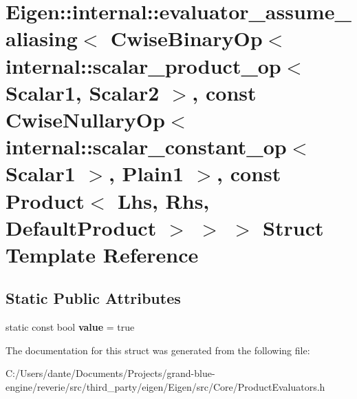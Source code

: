 \hypertarget{struct_eigen_1_1internal_1_1evaluator__assume__aliasing_3_01_cwise_binary_op_3_01internal_1_1scae866e2c7242096d7b5fd789e3b867e0a}{}\section{Eigen\+::internal\+::evaluator\+\_\+assume\+\_\+aliasing$<$ Cwise\+Binary\+Op$<$ internal\+::scalar\+\_\+product\+\_\+op$<$ Scalar1, Scalar2 $>$, const Cwise\+Nullary\+Op$<$ internal\+::scalar\+\_\+constant\+\_\+op$<$ Scalar1 $>$, Plain1 $>$, const Product$<$ Lhs, Rhs, Default\+Product $>$ $>$ $>$ Struct Template Reference}
\label{struct_eigen_1_1internal_1_1evaluator__assume__aliasing_3_01_cwise_binary_op_3_01internal_1_1scae866e2c7242096d7b5fd789e3b867e0a}
\subsection*{Static Public Attributes}
\begin{DoxyCompactItemize}
\item 
\mbox{\label{struct_eigen_1_1internal_1_1evaluator__assume__aliasing_3_01_cwise_binary_op_3_01internal_1_1scae866e2c7242096d7b5fd789e3b867e0a_a6ef1525831a97f7b074cce88cf6139fb}} 
static const bool {\bfseries value} = true
\end{DoxyCompactItemize}


The documentation for this struct was generated from the following file\+:\begin{DoxyCompactItemize}
\item 
C\+:/\+Users/dante/\+Documents/\+Projects/grand-\/blue-\/engine/reverie/src/third\+\_\+party/eigen/\+Eigen/src/\+Core/Product\+Evaluators.\+h\end{DoxyCompactItemize}
